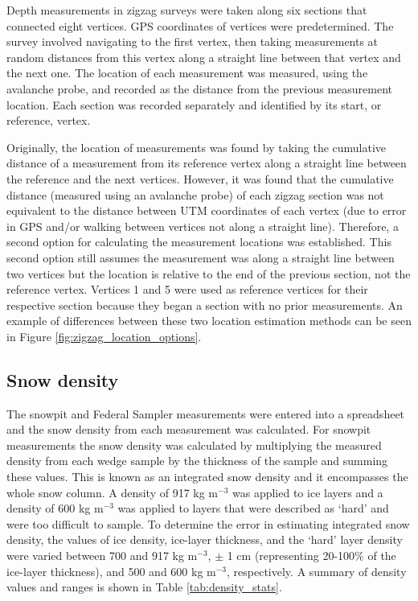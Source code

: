 \documentclass{sfuthesis}
\begin{document}
Depth measurements in zigzag surveys were taken along six sections that connected eight vertices. GPS coordinates of vertices were predetermined. The survey involved navigating to the first vertex, then taking measurements at random distances from this vertex along a straight line between that vertex and the next one. The location of each measurement was measured, using the avalanche probe, and recorded as the distance from the previous measurement location. Each section was recorded separately and identified by its start, or reference, vertex. 

Originally, the location of measurements was found by taking the cumulative distance of a measurement from its reference vertex along a straight line between the reference and the next vertices. However, it was found that the cumulative distance (measured using an avalanche probe) of each zigzag section was not equivalent to the distance between UTM coordinates of each vertex (due to error in GPS and/or walking between vertices not along a straight line). Therefore, a second option for calculating the measurement locations was established. This second option still assumes the measurement was along a straight line between two vertices but the location is relative to the end of the previous section, not the reference vertex. Vertices 1 and 5 were used as reference vertices for their respective section because they began a section with no prior measurements. An example of differences between these two location estimation methods can be seen in Figure \ref{fig:zigzag_location_options}.


\subsection{Snow density}

The snowpit and Federal Sampler measurements were entered into a spreadsheet and the snow density from each measurement was calculated. For snowpit measurements the snow density was calculated by multiplying the measured density from each wedge sample by the thickness of the sample and summing these values. This is known as an integrated snow density and it encompasses the whole snow column. A density of 917 kg m$^{-3}$ was applied to ice layers and a density of 600 kg m$^{-3}$ was applied to layers that were described as `hard' and were too difficult to sample. To determine the error in estimating integrated snow density, the values of ice density, ice-layer thickness, and the `hard' layer density were varied between 700 and 917 kg m$^{-3}$, $\pm$ 1 cm (representing 20-100\% of the ice-layer thickness), and 500 and 600 kg m$^{-3}$, respectively.  A summary of density values and ranges is shown in Table \ref{tab:density_stats}.
\end{document}
